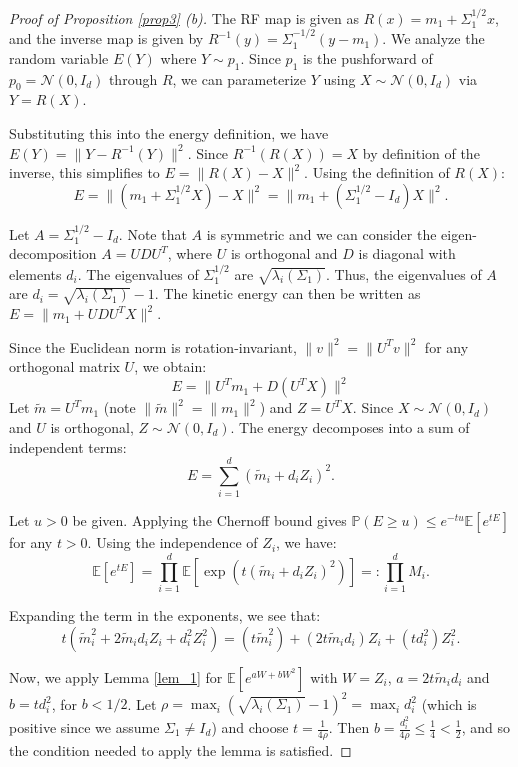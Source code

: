 \documentclass[a4paper,11pt]{article}
\theoremstyle{plain}
\theoremstyle{definition}
\begin{document}
\begin{proof}[Proof of Proposition \ref{prop3} (b)]
    The RF map is given as $R(x) = m_1 + \Sigma_1^{1/2}x$, and the inverse map is given by $R^{-1}(y) = \Sigma_1^{-1/2}(y - m_1)$. We analyze  the random variable $E(Y)$ where $Y \sim p_1$. Since $p_1$ is the pushforward of $p_0 = \mathcal{N}(0, I_d)$ through $R$, we can parameterize $Y$ using  $X \sim \mathcal{N}(0, I_d)$ via $Y = R(X)$.
    
    Substituting this into the energy definition, we have 
    $E(Y) = \| Y - R^{-1}(Y) \|^2.$
    Since $R^{-1}(R(X)) = X$ by definition of the inverse, this simplifies to $E = \| R(X) - X \|^2.$
    Using the definition of $R(X)$:$$E = \| (m_1 + \Sigma_1^{1/2}X) - X \|^2 = \| m_1 + (\Sigma_1^{1/2} - I_d)X \|^2.$$

    Let $A = \Sigma_1^{1/2} - I_d$. Note that $A$ is symmetric and we can consider the eigen-decomposition $A = U D U^T$, where $U$ is orthogonal and $D$ is diagonal with elements $d_i$. The eigenvalues of $\Sigma_1^{1/2}$ are $\sqrt{\lambda_i(\Sigma_1)}$. Thus, the eigenvalues of $A$ are 
    $d_i = \sqrt{\lambda_i(\Sigma_1)} - 1.$
    The kinetic energy can then be written as 
    $E = \| m_1 + U D U^T X \|^2.$ 
    
    Since the Euclidean norm is rotation-invariant, $\|v\|^2 = \|U^T v\|^2$ for any orthogonal matrix $U$, we obtain:
    $$E = \| U^T m_1 + D (U^T X) \|^2$$Let $\tilde{m} = U^T m_1$ (note $\|\tilde{m}\|^2 = \|m_1\|^2$) and $Z = U^T X$. Since $X \sim \mathcal{N}(0, I_d)$ and $U$ is orthogonal, $Z \sim \mathcal{N}(0, I_d)$. The energy decomposes into a sum of independent terms:
    $$E = \sum_{i=1}^d (\tilde{m}_i + d_i Z_i)^2.$$

    Let $u > 0$ be given. Applying the Chernoff bound gives 
    $\mathbb{P}(E \geq u) \leq e^{-tu} \mathbb{E}[e^{tE}]$ for any $t > 0$. Using the independence of $Z_i$, we have: 
    $$\mathbb{E}[e^{tE}] = \prod_{i=1}^d \mathbb{E}\left[ \exp\left( t(\tilde{m}_i + d_i Z_i)^2 \right) \right] =: \prod_{i=1}^d M_i.$$ 
    
    Expanding the term in the exponents, we see that:
    $$t(\tilde{m}_i^2 + 2\tilde{m}_i d_i Z_i + d_i^2 Z_i^2) = (t\tilde{m}_i^2) + (2t\tilde{m}_i d_i)Z_i + (t d_i^2)Z_i^2.$$
    
    Now, we apply Lemma \ref{lem_1} for $\mathbb{E}[e^{aW + bW^2}]$ with $W=Z_i$, $a = 2t\tilde{m}_i d_i$ and $b = t d_i^2$, for $b < 1/2$. 
    Let $\rho = \max_i (\sqrt{\lambda_i(\Sigma_1)} - 1)^2 = \max_i d_i^2$ (which is positive since we assume $\Sigma_1 \neq I_d$) and  choose $t = \frac{1}{4\rho}$. Then $b = \frac{d_i^2}{4\rho} \leq \frac{1}{4} < \frac{1}{2}$, and so the condition needed to apply the lemma is satisfied. 
    

\end{proof}
\end{document}

